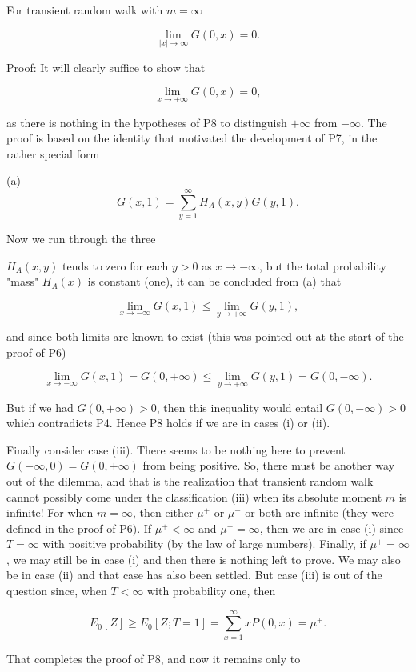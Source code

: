 For transient random walk with $m = \infty$

$$\lim_{|x| \to \infty} G(0,x) = 0.$$

Proof: It will clearly suffice to show that

$$\lim_{x \to +\infty} G(0,x) = 0,$$

as there is nothing in the hypotheses of P8 to distinguish $+\infty$ from $-\infty$. The proof is based on the identity that motivated the development of P7, in the rather special form

(a) $$G(x,1) = \sum_{y=1}^{\infty} H_A(x,y)G(y,1).$$

Now we run through the three

$H_A(x,y)$ tends to zero for each $y > 0$ as $x \rightarrow -\infty$, but the total probability "mass" $H_A(x)$ is constant (one), it can be concluded from (a) that

$$\lim_{x \rightarrow -\infty} G(x,1) \leq \lim_{y \rightarrow +\infty} G(y,1),$$

and since both limits are known to exist (this was pointed out at the start of the proof of P6)

$$\lim_{x \rightarrow -\infty} G(x,1) = G(0,+\infty) \leq \lim_{y \rightarrow +\infty} G(y,1) = G(0,-\infty).$$

But if we had $G(0,+\infty) > 0$, then this inequality would entail $G(0,-\infty) > 0$ which contradicts P4. Hence P8 holds if we are in cases (i) or (ii).

Finally consider case (iii). There seems to be nothing here to prevent $G(-\infty,0) = G(0,+\infty)$ from being positive. So, there must be another way out of the dilemma, and that is the realization that transient random walk cannot possibly come under the classification (iii) when its absolute moment $m$ is infinite! For when $m = \infty$, then either $\mu^+$ or $\mu^-$ or both are infinite (they were defined in the proof of P6). If $\mu^+ < \infty$ and $\mu^- = \infty$, then we are in case (i) since $T = \infty$ with positive probability (by the law of large numbers). Finally, if $\mu^+ = \infty$, we may still be in case (i) and then there is nothing left to prove. We may also be in case (ii) and that case has also been settled. But case (iii) is out of the question since, when $T < \infty$ with probability one, then

$$E_0[Z] \geq E_0[Z; T = 1] = \sum_{x=1}^{\infty} xP(0,x) = \mu^+.$$

That completes the proof of P8, and now it remains only to

